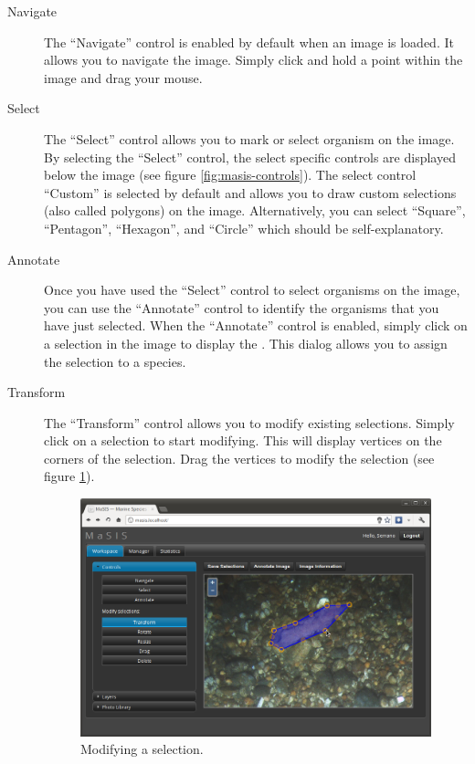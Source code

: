 \documentclass[twoside,a4paper]{refart}
\begin{document}
\begin{description}
\item[Navigate]
    The ``Navigate'' control is enabled by default when an image is loaded. It allows you to navigate the image. Simply click and hold a point within the image and drag your mouse.

\item[Select]
    The ``Select'' control allows you to mark or select organism on the image. By selecting the ``Select'' control, the select specific controls are displayed below the image (see figure \ref{fig:masis-controls}). The select control ``Custom'' is selected by default and allows you to draw custom selections (also called polygons) on the image. Alternatively, you can select ``Square'', ``Pentagon'', ``Hexagon'', and ``Circle'' which should be self-explanatory.

\item[Annotate]
    Once you have used the ``Select'' control to select organisms on the image, you can use the ``Annotate'' control to identify the organisms that you have just selected. When the ``Annotate'' control is enabled, simply click on a selection in the image to display the . This dialog allows you to assign the selection to a species.

\item[Transform]
    The ``Transform'' control allows you to modify existing selections. Simply click on a selection to start modifying. This will display vertices on the corners of the selection. Drag the vertices to modify the selection (see figure \ref{fig:masis-modify-selection}).

\begin{figure}[hbtp]
\centering
\includegraphics[width=\textwidth]{screenshots/masis-modify-selection}
\caption{Modifying a selection.}
\label{fig:masis-modify-selection}
\end{figure}


\end{description}
\end{document}
